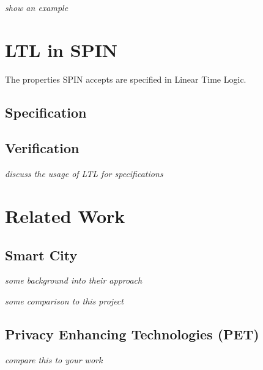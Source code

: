 \textit{show an example}

\section{LTL in SPIN}

The properties SPIN accepts are specified in Linear Time Logic. 

\subsection{Specification}
\subsection{Verification}

\textit{discuss the usage of LTL for specifications}

\section{Related Work}
\subsection{Smart City} 

\textit{some background into their approach}\cite{li2016privacy}

\textit{some comparison to this project}


\subsection{Privacy Enhancing Technologies (PET)}
\label{section:SmartCity}

\textit{compare this to your work}
